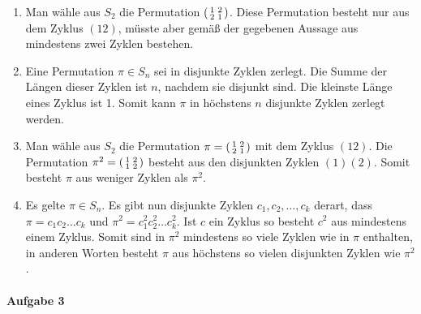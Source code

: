 \documentclass{article}
\begin{document}
\begin{enumerate}
    \item Man wähle aus $S_2$ die Permutation $\begin{psmallmatrix}1 & 2\\2 & 1\end{psmallmatrix}$. Diese Permutation besteht nur aus dem Zyklus $(1 2)$, müsste aber gemäß der gegebenen Aussage aus mindestens zwei Zyklen bestehen.

    \item Eine Permutation $\pi \in S_n$ sei in disjunkte Zyklen zerlegt. Die Summe der Längen dieser Zyklen ist $n$, nachdem sie disjunkt sind. Die kleinste Länge eines Zyklus ist 1. Somit kann $\pi$ in höchstens $n$ disjunkte Zyklen zerlegt werden. \label{itm:2b}
    
    \item Man wähle aus $S_2$ die Permutation $\pi = \begin{psmallmatrix}1 & 2\\2 & 1\end{psmallmatrix}$ mit dem Zyklus $(1 2)$. Die Permutation $\pi^2 = \begin{psmallmatrix}1 & 2\\1 & 2\end{psmallmatrix}$ besteht aus den disjunkten Zyklen $(1)(2)$. Somit besteht $\pi$ aus weniger Zyklen als $\pi^2$.

    \item Es gelte $\pi \in S_n$. Es gibt nun disjunkte Zyklen $c_1, c_2, \ldots, c_k$ derart, dass $\pi = c_1c_2 \ldots c_k$ und $\pi^2 = c_1^2c_2^2 \ldots c_k^2$. Ist $c$ ein Zyklus so besteht $c^2$ aus mindestens einem Zyklus. Somit sind in $\pi^2$ mindestens so viele Zyklen wie in $\pi$ enthalten, in anderen Worten besteht $\pi$ aus höchstens so vielen disjunkten Zyklen wie $\pi^2$.
\end{enumerate}

\paragraph{Aufgabe 3}
\end{document}
